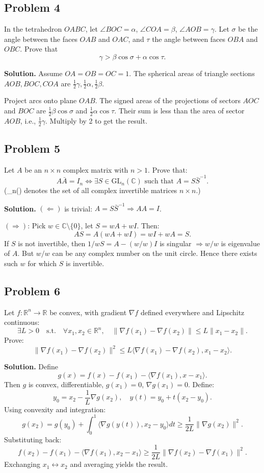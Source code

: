 \documentclass{article}
\begin{document}
\subsection*{Problem 4}
In the tetrahedron $OABC$, let $\angle BOC = \alpha$, $\angle COA = \beta$, $\angle AOB = \gamma$.
Let $\sigma$ be the angle between the faces $OAB$ and $OAC$,
and $\tau$ the angle between faces $OBA$ and $OBC$. Prove that
\[
    \gamma > \beta \cos \sigma + \alpha \cos \tau.
\]

\textbf{Solution.}
Assume $OA = OB = OC = 1$. The spherical areas of triangle sections $AOB, BOC, COA$ are $\frac{1}{2}\gamma, \frac{1}{2}\alpha, \frac{1}{2}\beta$.

Project arcs onto plane $OAB$. The signed areas of the projections of sectors $AOC$ and $BOC$ are $\frac{1}{2} \beta \cos \sigma$ and $\frac{1}{2} \alpha \cos \tau$. Their sum is less than the area of sector $AOB$, i.e., $\frac{1}{2} \gamma$. Multiply by 2 to get the result.

\subsection*{Problem 5}

Let $A$ be an $n \times n$ complex matrix with $n > 1$. Prove that:
\[
    A\bar{A} = I_n \iff \exists S \in \mathrm{GL}_n(\mathbb{C}) \text{ such that } A = S \bar{S}^{-1}.
\]
(_n() denotes the set of all complex invertible matrices \(n \times n\).)

\textbf{Solution.}
$(\Leftarrow)$ is trivial: $A = S \bar{S}^{-1} \Rightarrow AA = I$.

$(\Rightarrow)$: Pick $w \in \mathbb{C} \setminus \{0\}$, let $S = wA + w I$. Then:
\[
AS = A(wA + wI) = w I + w A = S.
\]
If $S$ is not invertible, then $1/w S = A - (w/w)I$ is singular $\Rightarrow w/w$ is eigenvalue of $A$. But $w/w$ can be any complex number on the unit circle. Hence there exists such $w$ for which $S$ is invertible.

\subsection*{Problem 6}

Let $f : \mathbb{R}^n \to \mathbb{R}$ be convex, with gradient $\nabla f$ defined everywhere and Lipschitz continuous:
\[
\exists L > 0 \quad \text{s.t.} \quad \forall x_1, x_2 \in \mathbb{R}^n,\quad \|\nabla f(x_1) - \nabla f(x_2)\| \le L \|x_1 - x_2\|.
\]
Prove:
\[
\|\nabla f(x_1) - \nabla f(x_2)\|^2 \le L \langle \nabla f(x_1) - \nabla f(x_2), x_1 - x_2 \rangle.
\]

\textbf{Solution.}
Define
\[
g(x) = f(x) - f(x_1) - \langle \nabla f(x_1), x - x_1 \rangle.
\]
Then $g$ is convex, differentiable, $g(x_1) = 0$, $\nabla g(x_1) = 0$. Define:
\[
y_0 = x_2 - \frac{1}{L} \nabla g(x_2), \quad y(t) = y_0 + t(x_2 - y_0).
\]
Using convexity and integration:
\[
g(x_2) = g(y_0) + \int_0^1 \langle \nabla g(y(t)), x_2 - y_0 \rangle dt \ge \frac{1}{2L} \|\nabla g(x_2)\|^2.
\]
Substituting back:
\[
f(x_2) - f(x_1) - \langle \nabla f(x_1), x_2 - x_1 \rangle \ge \frac{1}{2L} \|\nabla f(x_2) - \nabla f(x_1)\|^2.
\]
Exchanging $x_1 \leftrightarrow x_2$ and averaging yields the result.
\end{document}
